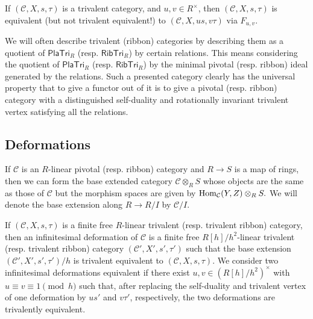 \documentclass[12pt]{amsart}
\begin{document}
\begin{lemma} \label{lem:rescaling}
    If $(\mathcal{C},X,s,\tau)$ is a trivalent category, and $u,v \in R^\times$, then $(\mathcal{C},X,s,\tau)$ is equivalent (but not trivalent equivalent!) to $(\mathcal{C},X,u s,v \tau)$ via $F_{u,v}$.
\end{lemma}

We will often describe trivalent (ribbon) categories by describing them as a quotient of $\mathsf{PlaTri}_R$ (resp. $\mathsf{RibTri}_R$) by certain relations. This means considering the quotient of $\mathsf{PlaTri}_R$ (resp. $\mathsf{RibTri}_R$) by the minimal pivotal (resp. ribbon) ideal generated by the relations. Such a presented category clearly has the universal property that to give a functor out of it is to give a pivotal (resp. ribbon)
category with a distinguished self-duality and rotationally invariant trivalent vertex satisfying all the relations.


\subsection{Deformations}

If $\mathcal{C}$ is an $R$-linear pivotal (resp. ribbon) category and $R \rightarrow S$ is a map of rings, then we can form the base extended category $\mathcal{C} \otimes_R S$ whose objects are the same as those of $\mathcal{C}$ but the morphism spaces are given by $\operatorname{Hom}_{\mathcal{C}}(Y,Z) \otimes_R S.$ We will denote the base extension along $R \rightarrow R/I$ by $\mathcal{C}/I$.

\begin{definition}
    If $(\mathcal{C}, X, s, \tau)$ is a finite free $R$-linear trivalent (resp. trivalent ribbon) category, then an infinitesimal deformation of $\mathcal{C}$ is a finite free $R[h]/h^2$-linear trivalent (resp. trivalent ribbon) category $(\mathcal{C}', X', s', \tau')$ such that the base extension $(\mathcal{C}', X', s', \tau')/h$ is trivalent equivalent to $(\mathcal{C}, X, s, \tau)$. We consider two infinitesimal deformations equivalent if there exist $u,v\in (R[h]/h^2)^\times$ with $u\equiv v\equiv 1 \pmod h$ such that, after replacing the self-duality and trivalent vertex of one deformation by $us'$ and $v\tau'$, respectively, the two deformations are trivalently equivalent.
\end{definition}
\end{document}
